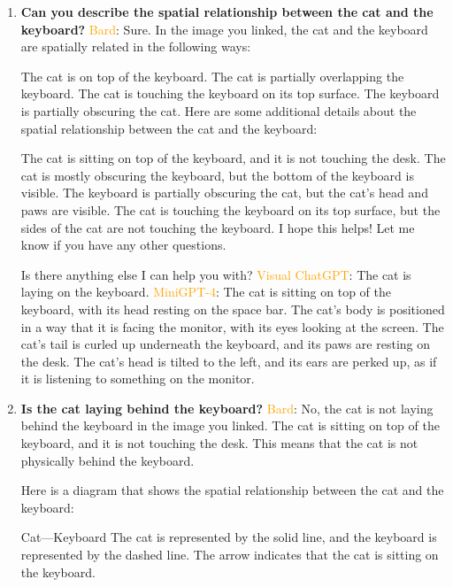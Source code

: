     \begin{enumerate}
        \item \textbf{Can you describe the spatial relationship between the cat and the keyboard?}
        \subitem \textcolor{orange}{Bard}: 
        Sure. In the image you linked, the cat and the keyboard are spatially related in the following ways:
        
        The cat is on top of the keyboard.
        The cat is partially overlapping the keyboard.
        The cat is touching the keyboard on its top surface.
        The keyboard is partially obscuring the cat.
        Here are some additional details about the spatial relationship between the cat and the keyboard:
        
        The cat is sitting on top of the keyboard, and it is not touching the desk.
        The cat is mostly obscuring the keyboard, but the bottom of the keyboard is visible.
        The keyboard is partially obscuring the cat, but the cat's head and paws are visible.
        The cat is touching the keyboard on its top surface, but the sides of the cat are not touching the keyboard.
        I hope this helps! Let me know if you have any other questions.
        
        Is there anything else I can help you with?
        \subitem \textcolor{orange}{Visual ChatGPT}: The cat is laying on the keyboard.
        \subitem \textcolor{orange}{MiniGPT-4}: The cat is sitting on top of the keyboard, with its head resting on the space bar. The cat’s body is positioned in a way that it is facing the monitor, with its eyes looking at the screen. The cat’s tail is curled up underneath the keyboard, and its paws are resting on the desk. The cat’s head is tilted to the left, and its ears are perked up, as if it is listening to something on the monitor.
        \item \textbf{Is the cat laying behind the keyboard?}
        \subitem \textcolor{orange}{Bard}: 
        No, the cat is not laying behind the keyboard in the image you linked. The cat is sitting on top of the keyboard, and it is not touching the desk. This means that the cat is not physically behind the keyboard.
        
        Here is a diagram that shows the spatial relationship between the cat and the keyboard:
        
        Cat---Keyboard
        The cat is represented by the solid line, and the keyboard is represented by the dashed line. The arrow indicates that the cat is sitting on the keyboard.
        

\end{enumerate}
